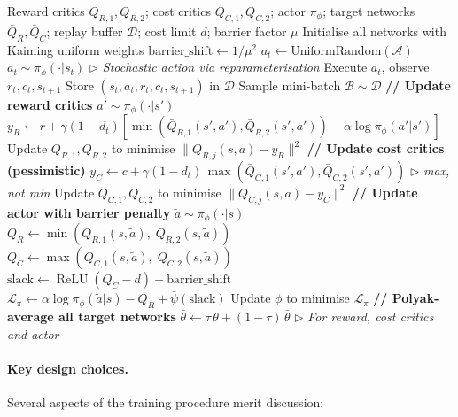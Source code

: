 \begin{algorithm}[htbp]
\caption{CSAC-LB Training (adapted from Zhang et~al.~\cite{zhang2024csaclb})}
\label{alg:csac-lb}
\begin{algorithmic}[1]
\REQUIRE Reward critics $Q_{R,1}, Q_{R,2}$; cost critics $Q_{C,1}, Q_{C,2}$;
  actor $\pi_\phi$; target networks $\bar{Q}_{R}, \bar{Q}_{C}$;
  replay buffer $\mathcal{D}$; cost limit $d$; barrier factor $\mu$
\STATE Initialise all networks with Kaiming uniform weights
\STATE $\text{barrier\_shift} \gets 1/\mu^2$
    \STATE $a_t \gets \text{UniformRandom}(\mathcal{A})$
  \ELSE
    \STATE $a_t \sim \pi_\phi(\cdot | s_t)$
    \hfill $\triangleright$ \textit{Stochastic action via reparameterisation}
  \ENDIF
  \STATE Execute $a_t$, observe $r_t, c_t, s_{t+1}$
  \STATE Store $(s_t, a_t, r_t, c_t, s_{t+1})$ in $\mathcal{D}$
    \STATE Sample mini-batch $\mathcal{B} \sim \mathcal{D}$
    \STATE \textbf{// Update reward critics}
    \STATE $a' \sim \pi_\phi(\cdot | s')$
    \STATE $y_R \gets r + \gamma(1-d_t)[\min(\bar{Q}_{R,1}(s',a'), \bar{Q}_{R,2}(s',a')) - \alpha \log \pi_\phi(a'|s')]$
    \STATE Update $Q_{R,1}, Q_{R,2}$ to minimise $\|Q_{R,j}(s,a) - y_R\|^2$
    \STATE \textbf{// Update cost critics (pessimistic)} \label{line:cost-target}
    \STATE $y_C \gets c + \gamma(1-d_t)\,\max(\bar{Q}_{C,1}(s',a'), \bar{Q}_{C,2}(s',a'))$
    \hfill $\triangleright$ \textit{max, not min}
    \STATE Update $Q_{C,1}, Q_{C,2}$ to minimise $\|Q_{C,j}(s,a) - y_C\|^2$
      \STATE \textbf{// Update actor with barrier penalty} \label{line:barrier-penalty}
      \STATE $\tilde{a} \sim \pi_\phi(\cdot | s)$
      \STATE $Q_R \gets \min(Q_{R,1}(s,\tilde{a}),\; Q_{R,2}(s,\tilde{a}))$
      \STATE $Q_C \gets \max(Q_{C,1}(s,\tilde{a}),\; Q_{C,2}(s,\tilde{a}))$
      \STATE $\text{slack} \gets \operatorname{ReLU}(Q_C - d) - \text{barrier\_shift}$
      \STATE $\mathcal{L}_\pi \gets \alpha \log \pi_\phi(\tilde{a}|s) - Q_R + \bar{\psi}(\text{slack})$
      \STATE Update $\phi$ to minimise $\mathcal{L}_\pi$
      \STATE \textbf{// Polyak-average all target networks}
      \STATE $\bar{\theta} \gets \tau\,\theta + (1-\tau)\,\bar{\theta}$
      \hfill $\triangleright$ \textit{For reward, cost critics and actor}
    \ENDIF
  \ENDIF
\ENDFOR
\end{algorithmic}
\end{algorithm}

\paragraph{Key design choices.}
Several aspects of the training procedure merit discussion:

